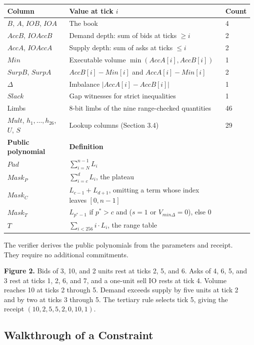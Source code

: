 \begin{longtable}[]{@{}lll@{}}
\toprule\noalign{}
Column & Value at tick \(i\) & Count \\
\midrule\noalign{}
\endhead
\bottomrule\noalign{}
\endlastfoot
\(B\), \(A\), \(IOB\), \(IOA\) & The book & 4 \\
\(AccB\), \(IOAccB\) & Demand depth: sum of bids at ticks \(\ge i\) & 2 \\
\(AccA\), \(IOAccA\) & Supply depth: sum of asks at ticks \(\le i\) & 2 \\
\(Min\) & Executable volume \(\min(AccA[i], AccB[i])\) & 1 \\
\(SurpB\), \(SurpA\) & \(AccB[i] - Min[i]\) and \(AccA[i] - Min[i]\) & 2 \\
\(\Delta\) & Imbalance \(\lvert AccA[i] - AccB[i] \rvert\) & 1 \\
\(Slack\) & Gap witnesses for strict inequalities & 1 \\
Limbs & 8-bit limbs of the nine range-checked quantities & 46 \\
\(Mult\), \(h_1, \ldots, h_{26}\), \(U\), \(S\) & Lookup columns (Section 3.4) & 29 \\
\textbf{Public polynomial} & \textbf{Definition} & \\
\(Pad\) & \(\sum_{i=N}^{n-1} L_i\) & \\
\(Mask_P\) & \(\sum_{i=c}^{d} L_i\), the plateau & \\
\(Mask_C\) & \(L_{c-1} + L_{d+1}\), omitting a term whose index leaves \([0, n-1]\) & \\
\(Mask_T\) & \(L_{p^*-1}\) if \(p^* > c\) and (\(s = 1\) or \(V_{min\Delta} = 0\)), else 0 & \\
\(T\) & \(\sum_{i < 256} i \cdot L_i\), the range table & \\
\end{longtable}

The verifier derives the public polynomials from the parameters and receipt. They require no additional commitments.



\textbf{Figure 2.} Bids of 3, 10, and 2 units rest at ticks 2, 5, and 6. Asks of 4, 6, 5, and 3 rest at ticks 1, 2, 6, and 7, and a one-unit sell IO rests at tick 4. Volume reaches 10 at ticks 2 through 5. Demand exceeds supply by five units at tick 2 and by two at ticks 3 through 5. The tertiary rule selects tick 5, giving the receipt \((10,2,5,5,2,0,10,1)\).

\subsection{Walkthrough of a Constraint}

